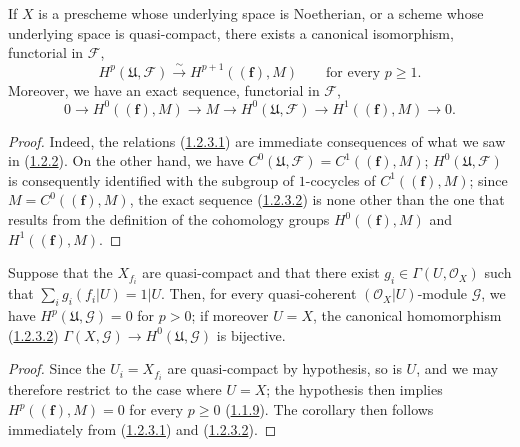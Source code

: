 \begin{proposition}[1.2.3]
\label{III.1.2.3}
If $X$ is a prescheme whose underlying space is Noetherian, or a
scheme whose underlying space is quasi-compact, there exists a canonical
isomorphism, functorial in $\mathcal F$,
\begin{equation}
\label{III.1.2.3.1}
\tag{1.2.3.1}
H^p(\mathfrak U,\mathcal F)\xrightarrow{\sim}H^{p+1}((\mathbf f),M)
\qquad\text{for every }p\geq1.
\end{equation}
Moreover, we have an exact sequence, functorial in $\mathcal F$,
\begin{equation}
\label{III.1.2.3.2}
\tag{1.2.3.2}
0\longrightarrow H^0((\mathbf f),M)\longrightarrow M
\longrightarrow H^0(\mathfrak U,\mathcal F)
\longrightarrow H^1((\mathbf f),M)\longrightarrow0.
\end{equation}
\end{proposition}

\begin{proof}
Indeed, the relations (\hyperref[III.1.2.3.1]{1.2.3.1}) are immediate
consequences of what we saw in (\hyperref[III.1.2.2]{1.2.2}). On the
other hand, we have
$C^0(\mathfrak U,\mathcal F)=C^1((\mathbf f),M)$;
$H^0(\mathfrak U,\mathcal F)$ is consequently identified with the subgroup of
$1$-cocycles of $C^1((\mathbf f),M)$; since
$M=C^0((\mathbf f),M)$, the exact sequence
(\hyperref[III.1.2.3.2]{1.2.3.2}) is none other than the one that results
from the definition of the cohomology groups $H^0((\mathbf f),M)$ and
$H^1((\mathbf f),M)$.
\end{proof}

\begin{corollary}[1.2.4]
\label{III.1.2.4}
Suppose that the $X_{f_i}$ are quasi-compact and that there exist
$g_i\in\Gamma(U,\mathcal O_X)$ such that
$\sum_i g_i(f_i\vert U)=1\vert U$. Then, for every quasi-coherent
$(\mathcal O_X\vert U)$-module $\mathcal G$, we have
$H^p(\mathfrak U,\mathcal G)=0$ for $p>0$; if moreover $U=X$,
the canonical homomorphism (\hyperref[III.1.2.3.2]{1.2.3.2})
$\Gamma(X,\mathcal G)\to H^0(\mathfrak U,\mathcal G)$ is bijective.
\end{corollary}

\begin{proof}
Since the $U_i=X_{f_i}$ are quasi-compact by hypothesis, so is $U$, and we
may therefore restrict to the case where $U=X$; the hypothesis then implies
$H^p((\mathbf f),M)=0$ for every $p\geq0$
(\hyperref[III.1.1.9]{1.1.9}). The corollary then follows immediately from
(\hyperref[III.1.2.3.1]{1.2.3.1}) and
(\hyperref[III.1.2.3.2]{1.2.3.2}).
\end{proof}

